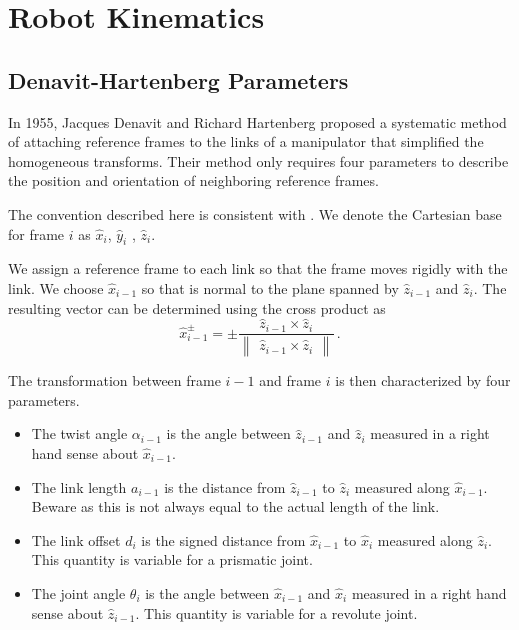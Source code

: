 \documentclass[11pt, onecolumn, oneside, reqno]{article}
\begin{document}
\section{Robot Kinematics}
\subsection{Denavit-Hartenberg Parameters}
In 1955, Jacques Denavit and Richard Hartenberg proposed a systematic method of attaching reference frames to the links of a manipulator that simplified the homogeneous transforms. Their method only requires four parameters to describe the position and orientation of neighboring reference frames.

The convention described here is consistent with \cite{Craig-2005}. We denote the Cartesian base for frame $i$ as $\hat{x}_i$, $\hat{y}_i$ ,  $\hat{z}_i$.

We assign a reference frame to each link so that the frame moves rigidly with the link. We choose $\hat{x}_{i-1}$ so that is normal to the plane spanned by $\hat{z}_{i-1}$ and $\hat{z}_i$. The resulting vector can be determined using the cross product as
\begin{equation}
\label{eq:common_normal}
\hat{x}_{i-1}^{\pm} = \pm \frac{\hat{z}_{i-1} \times \hat{z}_i}{\begin{Vmatrix}
\hat{z}_{i-1} \times \hat{z}_i
\end{Vmatrix}} \, .
\end{equation}

The transformation between frame $i-1$ and frame $i$ is then characterized by four parameters.
\begin{itemize}
\item The twist angle $\alpha_{i-1}$ is the angle between $\hat{z}_{i-1}$ and $\hat{z}_i$ measured in a right hand sense about $\hat{x}_{i-1}$.
\item The link length $a_{i-1}$ is the distance from $\hat{z}_{i-1}$ to $\hat{z}_i$ measured along $\hat{x}_{i-1}$. Beware as this is not always equal to the actual length of the link.
\item The link offset $d_i$ is the signed distance from $\hat{x}_{i-1}$ to $\hat{x}_i$ measured along $\hat{z}_i$. This quantity is variable for a prismatic joint.
\item The joint angle $\theta_i$ is the angle between $\hat{x}_{i-1}$ and $\hat{x}_i$ measured in a right hand sense about $\hat{z}_{i-1}$. This quantity is variable for a revolute joint.
\end{itemize}
\end{document}
